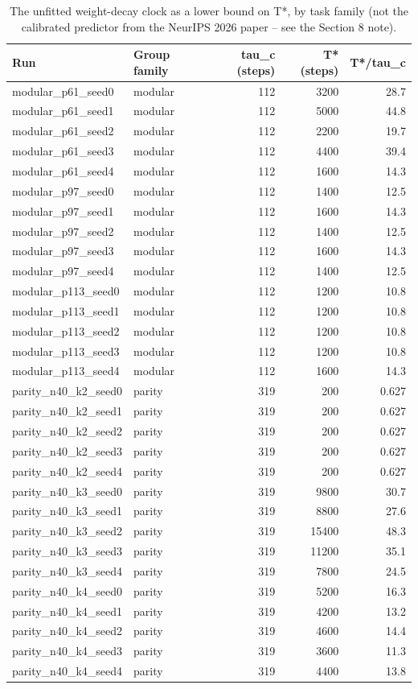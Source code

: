 \begin{table}
\caption{The unfitted weight-decay clock as a lower bound on T*, by task family (not the calibrated predictor from the NeurIPS 2026 paper -- see the Section 8 note).}
\label{tab:clock}
\begin{tabular}{llrrr}
\toprule
Run & Group family & tau\_c (steps) & T* (steps) & T*/tau\_c \\
\midrule
modular\_p61\_seed0 & modular & 112 & 3200 & 28.7 \\
modular\_p61\_seed1 & modular & 112 & 5000 & 44.8 \\
modular\_p61\_seed2 & modular & 112 & 2200 & 19.7 \\
modular\_p61\_seed3 & modular & 112 & 4400 & 39.4 \\
modular\_p61\_seed4 & modular & 112 & 1600 & 14.3 \\
modular\_p97\_seed0 & modular & 112 & 1400 & 12.5 \\
modular\_p97\_seed1 & modular & 112 & 1600 & 14.3 \\
modular\_p97\_seed2 & modular & 112 & 1400 & 12.5 \\
modular\_p97\_seed3 & modular & 112 & 1600 & 14.3 \\
modular\_p97\_seed4 & modular & 112 & 1400 & 12.5 \\
modular\_p113\_seed0 & modular & 112 & 1200 & 10.8 \\
modular\_p113\_seed1 & modular & 112 & 1200 & 10.8 \\
modular\_p113\_seed2 & modular & 112 & 1200 & 10.8 \\
modular\_p113\_seed3 & modular & 112 & 1200 & 10.8 \\
modular\_p113\_seed4 & modular & 112 & 1600 & 14.3 \\
parity\_n40\_k2\_seed0 & parity & 319 & 200 & 0.627 \\
parity\_n40\_k2\_seed1 & parity & 319 & 200 & 0.627 \\
parity\_n40\_k2\_seed2 & parity & 319 & 200 & 0.627 \\
parity\_n40\_k2\_seed3 & parity & 319 & 200 & 0.627 \\
parity\_n40\_k2\_seed4 & parity & 319 & 200 & 0.627 \\
parity\_n40\_k3\_seed0 & parity & 319 & 9800 & 30.7 \\
parity\_n40\_k3\_seed1 & parity & 319 & 8800 & 27.6 \\
parity\_n40\_k3\_seed2 & parity & 319 & 15400 & 48.3 \\
parity\_n40\_k3\_seed3 & parity & 319 & 11200 & 35.1 \\
parity\_n40\_k3\_seed4 & parity & 319 & 7800 & 24.5 \\
parity\_n40\_k4\_seed0 & parity & 319 & 5200 & 16.3 \\
parity\_n40\_k4\_seed1 & parity & 319 & 4200 & 13.2 \\
parity\_n40\_k4\_seed2 & parity & 319 & 4600 & 14.4 \\
parity\_n40\_k4\_seed3 & parity & 319 & 3600 & 11.3 \\
parity\_n40\_k4\_seed4 & parity & 319 & 4400 & 13.8 \\
\bottomrule
\end{tabular}
\end{table}
